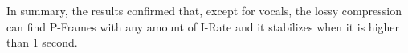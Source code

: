 In summary, the results confirmed that, except for vocals, the lossy compression can find P-Frames with any amount of I-Rate and it stabilizes when it is higher than 1 second.


%   

